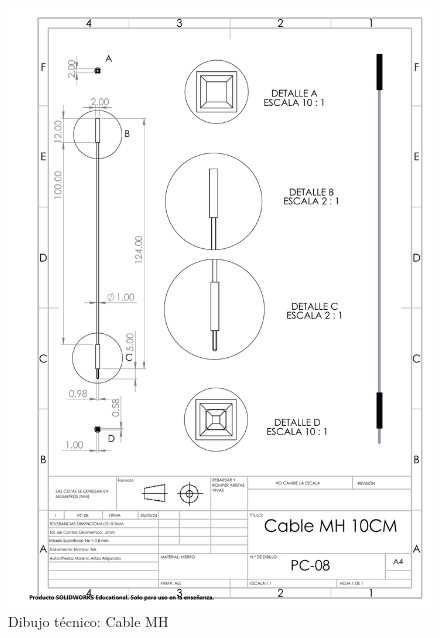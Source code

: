 \begin{figure}[H]
    \centering
    \includegraphics[trim = {7mm 1mm 1mm 1mm},clip,scale=0.4]{22/Img/cableMHDibujo.PDF}
    \caption{Dibujo técnico: Cable MH}
    \label{fig:enter-label8}
\end{figure}

